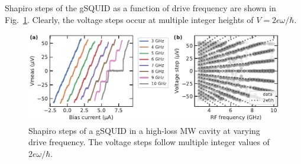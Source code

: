 Shapiro steps of the gSQUID as a function of drive frequency are shown in Fig.~\ref{fig:Shapirofreq}.
%
Clearly, the voltage steps occur at multiple integer heights of $V=2e\omega/\hbar$.

\begin{figure}
	\centering
	\includegraphics[width=\linewidth]{appendix/gJJ-misc-figs/fig_ShapiroHeroFreq}
	\caption{
		Shapiro steps of a gSQUID in a high-loss MW cavity at varying drive frequency.
		The voltage steps follow multiple integer values of $2e\omega/\hbar$.
	}
	\label{fig:Shapirofreq}
\end{figure}


